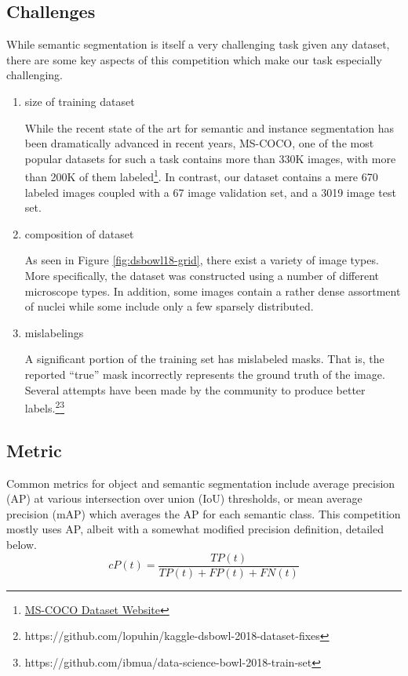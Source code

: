\documentclass[paper=letter, fontsize=12pt]{article}
\numberwithin{equation}{section} %
\numberwithin{figure}{section} %
\numberwithin{table}{section} %
\begin{document}
\subsection{Challenges}

While semantic segmentation is itself a very challenging task given any 
dataset, there are some key aspects of this competition which make our task
especially challenging.

\begin{enumerate}

    \item size of training dataset

        While the recent state of the art for semantic and instance
        segmentation has been dramatically advanced in recent years, MS-COCO,
        one of the most popular datasets for such a task contains more than
        330K images, with more than 200K of them
        labeled\footnote{\href{http://cocodataset.org}{MS-COCO Dataset
        Website}}.  In contrast, our dataset contains a mere 670 labeled images
        coupled with a 67 image validation set, and a 3019 image test set.

    \item composition of dataset

        As seen in Figure \ref{fig:dsbowl18-grid}, there exist a variety of
        image types.  More specifically, the dataset was constructed using a 
        number of different microscope types.  In addition, some images contain
        a rather dense assortment of nuclei while some include only a few 
        sparsely distributed.

    \item mislabelings

        A significant portion of the training set has mislabeled masks.  That
        is, the reported ``true'' mask incorrectly represents the ground truth
        of the image.  Several attempts have been made by the community to
        produce better
        labels.\footnote{https://github.com/lopuhin/kaggle-dsbowl-2018-dataset-fixes}\footnote{https://github.com/ibmua/data-science-bowl-2018-train-set}

\end{enumerate}

\subsection{Metric}

Common metrics for object and semantic segmentation include average precision
(AP) at various intersection over union (IoU) thresholds, or mean average
precision (mAP) which averages the AP for each semantic class.  This
competition mostly uses AP, albeit with a somewhat modified precision
definition, detailed below.
\begin{equation}
    cP(t) = \frac{TP(t)}{TP(t) + FP(t) + FN(t)}
\end{equation}
\end{document}
